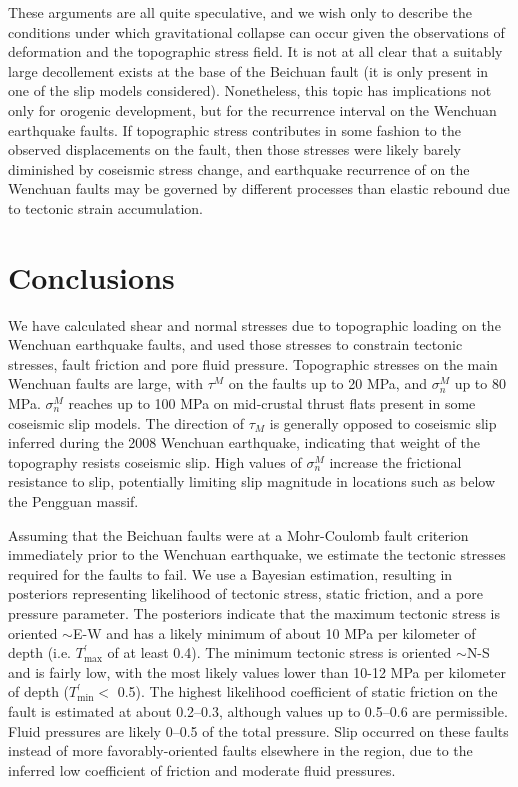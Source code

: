\documentclass[draft,jgrga]{AGUTeX}
\begin{document}
\begin{article}
These arguments are all quite speculative, and we wish only to describe the
conditions under which gravitational collapse can occur given the
observations of deformation and the topographic stress field. It is not
at all clear that a suitably large decollement exists at the base of the
Beichuan fault (it is only present in one of the slip models
considered). Nonetheless, this topic has implications not only for
orogenic development, but for the recurrence interval on the Wenchuan
earthquake faults. If topographic stress contributes in some fashion to
the observed displacements on the fault, then those stresses were likely
barely diminished by coseismic stress change, and earthquake recurrence
of on the Wenchuan faults may be governed by different processes than
elastic rebound due to tectonic strain accumulation.

\section{Conclusions}\label{conclusions}

We have calculated shear and normal stresses due to topographic loading
on the Wenchuan earthquake faults, and used those stresses to constrain
tectonic stresses, fault friction and pore fluid pressure. Topographic
stresses on the main Wenchuan faults are large, with $\tau^M$ on the
faults up to \textbar{}20\textbar{} MPa, and $\sigma^M_n$ up to 80 MPa.
$\sigma^M_n$ reaches up to 100 MPa on mid-crustal thrust flats present
in some coseismic slip models. The direction of $\tau_M$ is generally
opposed to coseismic slip inferred during the 2008 Wenchuan earthquake,
indicating that weight of the topography resists coseismic slip. High
values of $\sigma^M_n$ increase the frictional resistance to slip,
potentially limiting slip magnitude in locations such as below the
Pengguan massif.

Assuming that the Beichuan faults were at a Mohr-Coulomb fault criterion
immediately prior to the Wenchuan earthquake, we estimate the tectonic
stresses required for the faults to fail. We use a Bayesian estimation,
resulting in posteriors representing likelihood of tectonic stress,
static friction, and a pore pressure parameter. The posteriors
indicate that the maximum tectonic stress is oriented
$\sim$E-W and has a likely minimum of about 10 MPa per kilometer of depth
(i.e. $T^\prime_{\mathrm{max}}$ of at least 0.4).
The minimum tectonic stress is oriented $\sim$N-S and is
fairly low, with the most likely values lower than 10-12 MPa per kilometer of
depth ($T^\prime_{\mathrm{min}} <$ 0.5).
The highest likelihood coefficient of static friction on the fault is
estimated at about 0.2--0.3, although values up to 0.5--0.6 are
permissible. Fluid pressures are likely 0--0.5 of the total pressure.
Slip occurred on these faults instead of more favorably-oriented faults
elsewhere in the region, due to the inferred low coefficient of friction
and moderate fluid pressures.


\end{article}
\end{document}
